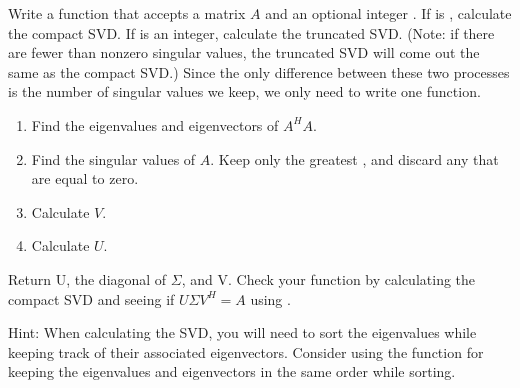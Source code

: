 \begin{problem}
Write a function  that accepts a matrix $A$ and an optional integer . 
If  is , calculate the compact SVD. If  is an integer, calculate the truncated SVD.
(Note: if there are fewer than  nonzero singular values, the truncated SVD will come out the same as the compact SVD.)
Since the only difference between these two processes is the number of singular values we keep, we only need to write one function.

\begin{enumerate}
\item Find the eigenvalues and eigenvectors of $A^H A$.
\item Find the singular values of $A$. Keep only the greatest , and discard any that are equal to zero.
\item Calculate $V$.
\item Calculate $U$.
\end{enumerate}

Return U, the diagonal of $\Sigma$, and V.
Check your function by calculating the compact SVD and seeing if $U\Sigma V^H = A$ using .

Hint: When calculating the SVD, you will need to sort the eigenvalues while keeping track of their associated eigenvectors. 
Consider using the function  for keeping the eigenvalues and eigenvectors in the same order while sorting.
\label{prob:calc_svd}
\end{problem}

